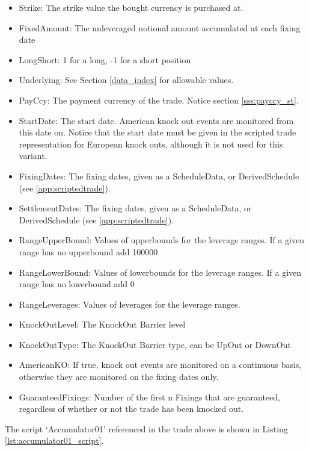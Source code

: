 \begin{itemize}
\item Strike: The strike value the bought currency is purchased at.
\item FixedAmount: The unleveraged notional amount accumulated at each fixing date
\item LongShort: 1 for a long, -1 for a short position
\item Underlying: See Section \ref{data_index} for allowable values.
\item PayCcy: The payment currency of the trade. Notice section \ref{sss:payccy_st}.
\item StartDate: The start date. American knock out events are monitored from this date on. Notice that the start date
  must be given in the scripted trade representation for European knock outs, although it is not used for this variant.
\item FixingDates: The fixing dates, given as a ScheduleData, or DerivedSchedule (see \ref{app:scriptedtrade}).
\item SettlementDates: The fixing dates, given as a ScheduleData, or DerivedSchedule (see \ref{app:scriptedtrade}).
\item RangeUpperBound: Values of upperbounds for the leverage ranges. If a given range has no upperbound add 100000
\item RangeLowerBound: Values of lowerbounds for the leverage ranges. If a given range has no lowerbound add 0
\item RangeLeverages: Values of leverages for the leverage ranges.
\item KnockOutLevel: The KnockOut Barrier level
\item KnockOutType: The KnockOut Barrier type, can be UpOut or DownOut
\item AmericanKO: If true, knock out events are monitored on a continuous basis, otherwise they are monitored on the
  fixing dates only.
\item GuaranteedFixings: Number of the first n Fixings that are guaranteed, regardless of whether or not the trade has been knocked out.
\end{itemize}

The script `Accumulator01' referenced in the trade above is shown in Listing \ref{lst:accumulator01_script}.

